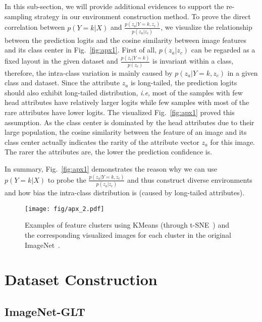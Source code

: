 \documentclass{article}
\def\ie{\emph{i.e}} \def\Ie{\emph{I.e}}
\begin{document}
In this sub-section, we will provide additional evidences to support the re-sampling strategy in our  environment construction method.
To prove the direct correlation between $p(Y=k|X)$ and $\frac{p(z_a|Y=k,z_c)}{p(z_a|z_c)}$, we visualize the relationship between the prediction logits and the cosine similarity between image features and its class center in Fig.~\ref{fig:apx1}. First of all, $p(z_a|z_c)$ can be regarded as a fixed layout in the given dataset and $\frac{p(z_c|Y=k)}{p(z_c)}$ is invariant within a class, therefore, the intra-class variation is mainly caused by $p(z_a|Y=k,z_c)$ in a given class and dataset. Since the attribute $z_a$ is long-tailed, the prediction logits should also exhibit long-tailed distribution, \ie, most of the samples with few head attributes have relatively larger logits while few samples with most of the rare attributes have lower logits. The visualized Fig.~\ref{fig:apx1} proved this assumption. As the class center is dominated by the head attributes due to their large population, the cosine similarity between the feature of an image and its class center actually indicates the rarity of the attribute vector $z_a$ for this image. The rarer the attributes are, the lower the prediction confidence is.

In summary, Fig.~\ref{fig:apx1} demonstrates the reason why we can use $p(Y=k|X)$ to probe the $\frac{p(z_a|Y=k,z_c)}{p(z_a|z_c)}$ and thus construct diverse environments and how bias the intra-class distribution is (caused by long-tailed attributes).


\begin{figure}
   \begin{minipage}[b]{1.0\linewidth}
   \centerline{\texttt{[image: fig/apx\_2.pdf]}}
   \end{minipage}
   \caption{Examples of feature clusters using KMeans (through t-SNE~\cite{hinton2002stochastic}) and the corresponding visualized images for each cluster in the original ImageNet~\cite{russakovsky2015imagenet}.}
   \label{fig:apx2} \end{figure}


\section{Dataset Construction}

\subsection{ImageNet-GLT}
\end{document}
